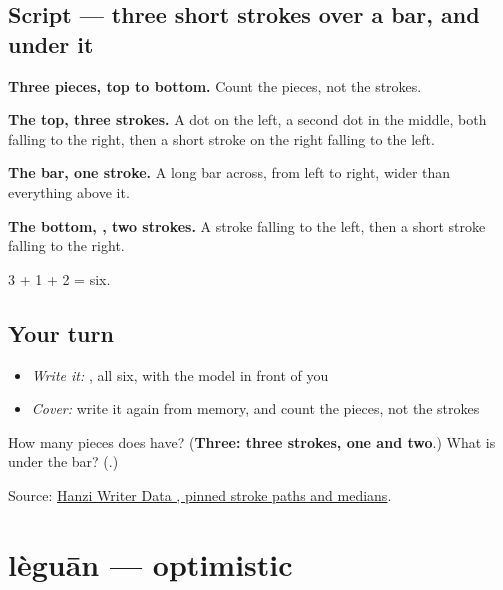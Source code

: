 \subsection*{Script — three short strokes over a bar, and  under it}

\begin{quote}
\end{quote}

\textbf{Three pieces, top to bottom.} Count the pieces, not the strokes.

\textbf{The top, three strokes.} A dot on the left, a second dot in the middle, both falling to the right, then a short stroke on the right falling to the left.

\textbf{The bar, one stroke.} A long bar across, from left to right, wider than everything above it.

\textbf{The bottom, , two strokes.} A stroke falling to the left, then a short stroke falling to the right.

3 + 1 + 2 = six.

\subsection*{Your turn}
\begin{itemize}
\raggedright
  \item \emph{Write it:} , all six, with the model in front of you
  \item \emph{Cover:} write it again from memory, and count the pieces, not the strokes
\end{itemize}

\begin{tcolorbox}[breakable,colback=teal!4,colframe=teal!35!black,title={Before you move on}]
How many pieces does  have? (\textbf{Three: three strokes, one and two}.) What is under the bar? (\textbf{}.)

Source: \href{https://raw.githubusercontent.com/chanind/hanzi-writer-data/68d10a4b21150cae5e1ebbd223eed289cf32d90c/data/\%E5\%85\%B4.json}{Hanzi Writer Data , pinned stroke paths and medians}.
\end{tcolorbox}
\section[lèguān]{lèguān — optimistic}

\label{lesson:ZH-C465-leguan}



